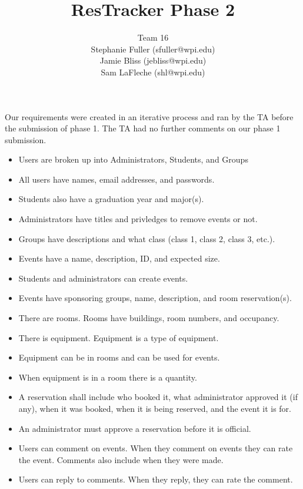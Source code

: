 \documentclass{article}
\title{ResTracker Phase 2}
\author{Team 16\\Stephanie Fuller (sfuller@wpi.edu)\\Jamie Bliss (jebliss@wpi.edu)\\Sam
LaFleche (shl@wpi.edu)}
\begin{document}
\maketitle


\section{}
Our requirements were created in an iterative process and ran by the TA before
the submission of phase 1. The TA had no further comments on our phase 1
submission. 

\begin{itemize}
\item Users are broken up into Administrators, Students, and Groups
\item All users have names, email addresses, and passwords.
\item Students also have a graduation year and major(s).
\item Administrators have titles and privledges to remove events or not. 
\item Groups have descriptions and what class (class 1, class 2, class 3, etc.).
\item Events have a name, description, ID, and expected size.
\item Students and administrators can create events.
\item Events have sponsoring groups, name, description, and room reservation(s).
\item There are rooms. Rooms have buildings, room numbers, and occupancy.
\item There is equipment. Equipment is a type of equipment.
\item Equipment can be in rooms and can be used for events.
\item When equipment is in a room there is a quantity.
\item A reservation shall include who booked it, what administrator
approved it (if any), when it was booked, when it is being reserved,
and the event it is for.
\item An administrator must approve a reservation before it is official.
\item Users can comment on events. When they comment on events they can rate the
event. Comments also include when they were made. 
\item Users can reply to comments. When they reply, they can rate the comment. 

\end{itemize}
\end{document}
